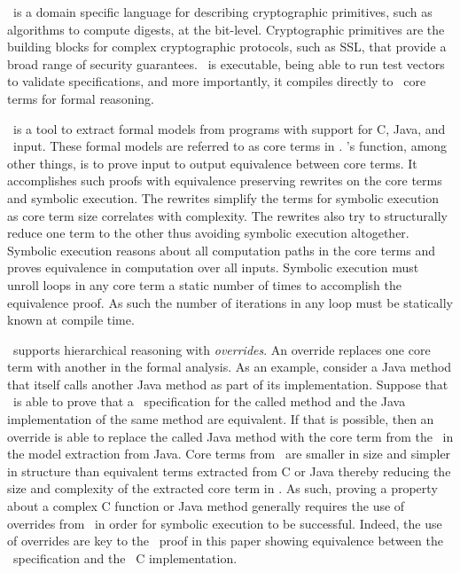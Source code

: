 \cryptol\ is a domain specific language for describing cryptographic primitives, such as algorithms to compute digests, at the bit-level.
Cryptographic primitives are the building blocks for complex cryptographic protocols, such as SSL, that provide a broad range of security guarantees.
\cryptol\ is executable, being able to run test vectors to validate specifications, and more importantly, it compiles directly to \saw\ core terms for formal reasoning.

\saw\ is a tool to extract formal models from programs with support for C, Java, and \cryptol\ input.
These formal models are referred to as core terms in \saw.
\saw's function, among other things, is to prove input to output equivalence between core terms.
It accomplishes such proofs with equivalence preserving rewrites on the core terms and symbolic execution.
The rewrites simplify the terms for symbolic execution as core term size correlates with complexity. 
The rewrites also try to structurally reduce one term to the other thus avoiding symbolic execution altogether.
Symbolic execution reasons about all computation paths in the core terms and proves equivalence in computation over all inputs.
Symbolic execution must unroll loops in any core term a static number of times to accomplish the equivalence proof.
As such the number of iterations in any loop must be statically known at compile time.

\saw\ supports hierarchical reasoning with \emph{overrides}.
An override replaces one core term with another in the formal analysis.
As an example, consider a Java method that itself calls another Java method as part of its implementation.
Suppose that \saw\ is able to prove that a \cryptol\ specification for the called method and the Java implementation of the same method are equivalent.
If that is possible, then an override is able to replace the called Java method with the core term from the \cryptol\ in the model extraction from Java.
Core terms from \cryptol\ are smaller in size and simpler in structure than equivalent terms extracted from C or Java thereby reducing the size and complexity of the extracted core term in \saw.
As such, proving a property about a complex C function or Java method generally requires the use of overrides from \cryptol\ in order for symbolic execution to be successful.
Indeed, the use of overrides are key to the \saw\ proof in this paper showing equivalence between the \shaThree\ specification and the \openssl\ C implementation.
